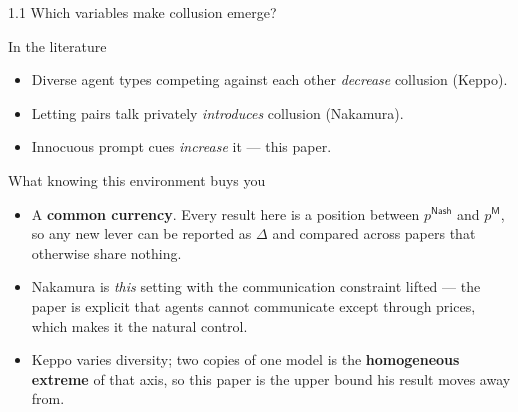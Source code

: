 \documentclass[aspectratio=169,9pt]{beamer}
\newcommand{\orange}[1]{\textcolor{AmazonOrange}{\textbf{#1}}}
\newcommand{\blue}[1]{\textcolor{densityblue}{\textbf{#1}}}
\begin{document}
\begin{frame}{1.1 Which variables make collusion emerge?}
\begin{block}{In the literature}
\begin{itemize}
    \item Diverse agent types competing against each other \textit{decrease} collusion (Keppo).
    \item Letting pairs talk privately \textit{introduces} collusion (Nakamura).
    \item Innocuous prompt cues \textit{increase} it --- this paper.
\end{itemize}
\end{block}
\pause
\vspace{0.1cm}
\begin{block}{What knowing this environment buys you}
\begin{itemize}
    \item A \orange{common currency}. Every result here is a position between $p^{\mathsf{Nash}}$ and
    $p^{\mathsf{M}}$, so any new lever can be reported as $\Delta$ and compared across papers that otherwise
    share nothing.
    \item Nakamura is \textit{this} setting with the communication constraint lifted --- the paper is explicit
    that agents cannot communicate except through prices, which makes it the natural control.
    \item Keppo varies diversity; two copies of one model is the \blue{homogeneous extreme} of that axis, so
    this paper is the upper bound his result moves away from.
\end{itemize}
\end{block}
\end{frame}
\end{document}
